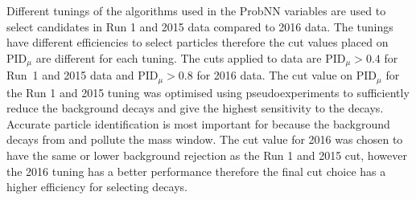 Different tunings of the algorithms used in the ProbNN variables are used to select candidates in Run 1 and 2015 data compared to 2016 data. The tunings have different efficiencies to select particles therefore the cut values placed on PID$_{\mu}$ are different for each tuning. The cuts applied to data are $\text{PID}_{\mu} > 0.4$ for Run~1 and 2015 data and $\text{PID}_{\mu} > 0.8$ for 2016 data. 
The cut value on PID$_{\mu}$ for the Run 1 and 2015 tuning was optimised using pseudoexperiments to sufficiently reduce the background decays and give the highest sensitivity to the \bdmumu decays. Accurate particle identification is most important for \bdmumu because the background decays from \bhh and \lambdab pollute the \bd mass window. The cut value for 2016 was chosen to have the same or lower background rejection as the Run 1 and 2015 cut, however the 2016 tuning has a better performance therefore the final cut choice has a higher efficiency for selecting \bmumu decays. 





